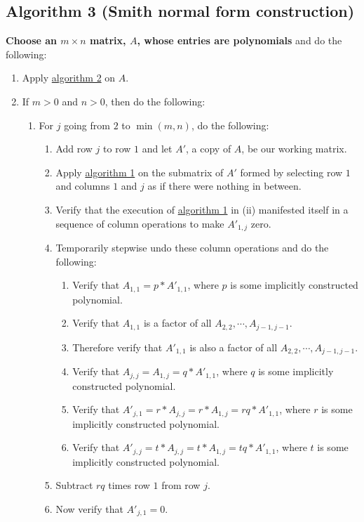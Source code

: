 \documentclass[twocolumn]{article}
\begin{document}
		\subsection{Algorithm 3 (Smith normal form construction)}\label{sec:algorithm 3}
			\textbf{Choose an $m\times n$ matrix, $A$, whose entries are polynomials} and do the following:
			\begin{enumerate}
				\item Apply \hyperref[sec:algorithm 2]{algorithm 2} on $A$.
				\item If $m>0$ and $n>0$, then do the following:
				\begin{enumerate}
					\item For $j$ going from $2$ to $\min(m,n)$, do the following:
					\begin{enumerate}
						\item Add row $j$ to row $1$ and let $A'$, a copy of $A$, be our working matrix.
						\item Apply \hyperref[sec:algorithm 1]{algorithm 1} on the submatrix of $A'$ formed by selecting row $1$ and columns $1$ and $j$ as if there were nothing in between.
						\item Verify that the execution of \hyperref[sec:algorithm 1]{algorithm 1} in (ii) manifested itself in a sequence of column operations to make $A'_{1,j}$ zero.
						\item Temporarily stepwise undo these column operations and do the following:
						\begin{enumerate}
							\item Verify that $A_{1,1}=p*A'_{1,1}$, where $p$ is some implicitly constructed polynomial.
							\item Verify that $A_{1,1}$ is a factor of all $A_{2,2},\cdots,A_{j-1,j-1}$.
							\item Therefore verify that $A'_{1,1}$ is also a factor of all $A_{2,2},\cdots,A_{j-1,j-1}$.
							\item Verify that $A_{j,j}=A_{1,j}=q*A'_{1,1}$, where $q$ is some implicitly constructed polynomial.
							\item Verify that $A'_{j,1}=r*A_{j,j}=r*A_{1,j}=rq*A'_{1,1}$, where $r$ is some implicitly constructed polynomial.
							\item Verify that $A'_{j,j}=t*A_{j,j}=t*A_{1,j}=tq*A'_{1,1}$, where $t$ is some implicitly constructed polynomial.
						\end{enumerate}
						\item Subtract $rq$ times row $1$ from row $j$.
						\item Now verify that $A'_{j,1}=0$.

\end{enumerate}
\end{enumerate}
\end{enumerate}
\end{document}
